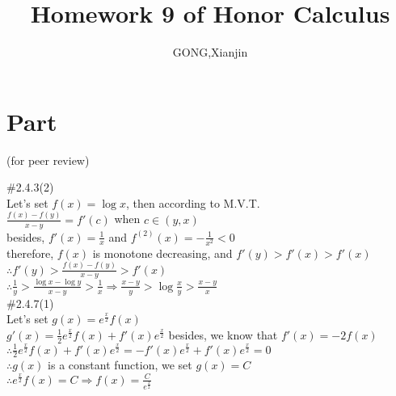 \documentclass{article}
\author{GONG,Xianjin}
\title{Homework 9 of Honor Calculus}
\begin{document}
\maketitle

\section{\textcolor[rgb]{0.70,0.00,0.00}{Part \uppercase\expandafter{}}}(for peer review)

\vspace{3.5mm}

\textcolor[rgb]{0.00,0.00,0.50}{\#2.4.3(2)}\\

Let's set $f(x)=\log x$, then according to M.V.T.\\

$\displaystyle\frac{f(x)-f(y)}{x-y}=f'(c)$ when $c\in(y,x)$\\

besides, $f'(x)=\displaystyle\frac{1}{x}$ and $f^{(2)}(x)=-\displaystyle\frac{1}{x^2}<0$\\

therefore, $f(x)$ is monotone decreasing, and $f'(y)>f'(x)>f'(x)$\\

$\therefore$\qquad$f'(y)>\displaystyle\frac{f(x)-f(y)}{x-y}>f'(x)$\\

$\therefore$\qquad$\displaystyle\frac{1}{y}>\frac{\log x-\log y}{x-y}>\frac{1}{x}\Rightarrow\frac{x-y}{y}>\log\frac{x}{y}>\frac{x-y}{x}$\\

\textcolor[rgb]{0.00,0.00,0.50}{\#2.4.7(1)}\\

Let's set $g(x)=\displaystyle e^{\frac{x}{2}}f(x)$\\

$g'(x)=\displaystyle\frac{1}{2}e^{\frac{x}{2}}f(x)+f'(x)e^{\frac{x}{2}}$ besides, we know that $f'(x)=-2f(x)$\\

$\therefore$\qquad$\displaystyle\frac{1}{2}e^{\frac{x}{2}}f(x)+f'(x)e^{\frac{x}{2}}=-f'(x)e^{\frac{x}{2}}+f'(x)e^{\frac{x}{2}}=0$\\

$\therefore$\qquad$g(x)$ is a constant function, we set $g(x)=C$\\

$\therefore$\qquad$\displaystyle e^{\frac{x}{2}}f(x)=C\Rightarrow f(x)=\displaystyle\frac{C}{e^{\frac{x}{2}}}$\\
\end{document}
